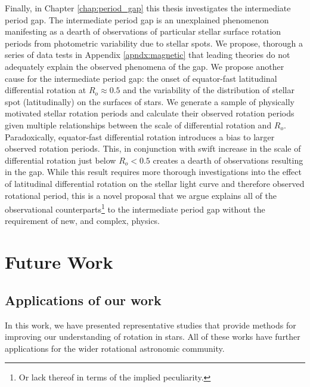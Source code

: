 Finally, in Chapter \ref{chap:period_gap} this thesis investigates the intermediate period gap.
The intermediate period gap is an unexplained phenomenon manifesting as a dearth of observations of particular stellar surface rotation periods from photometric variability due to stellar spots.
We propose, thorough a series of data tests in Appendix \ref{apndx:magnetic} that leading theories do not adequately explain the observed phenomena of the gap. 
We propose another cause for the intermediate period gap: the onset of equator-fast latitudinal differential rotation at $R_o \approx 0.5$ and the variability of the distribution of stellar spot (latitudinally) on the surfaces of stars.
We generate a sample of physically motivated stellar rotation periods and calculate their observed rotation periods given multiple relationships between the scale of differential rotation and $R_o$.
Paradoxically, equator-fast differential rotation introduces a bias to larger observed rotation periods.
This, in conjunction with swift increase in the scale of differential rotation just below $R_o<0.5$ creates a dearth of observations resulting in the gap.
While this result requires more thorough investigations into the effect of latitudinal differential rotation on the stellar light curve and therefore observed rotational period, this is a novel proposal that we argue explains all of the observational counterparts\footnote{Or lack thereof in terms of the implied peculiarity.} to the intermediate period gap without the requirement of new, and complex, physics.

\section{Future Work}

\subsection{Applications of our work}

In this work, we have presented representative studies that provide methods for improving our understanding of rotation in stars.
All of these works have further applications for the wider rotational astronomic community.

